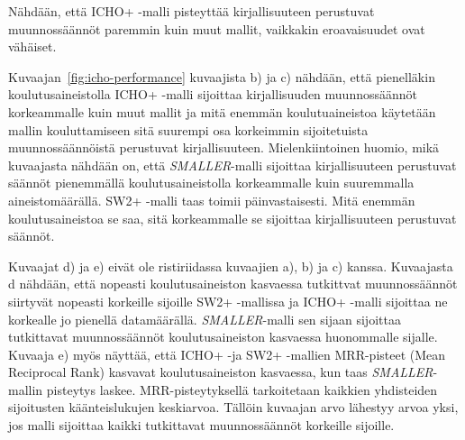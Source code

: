 \documentclass[finnish,twoside,censored,tkt,sw-line]{HYthesisML}
\begin{document}
Nähdään, että ICHO+ -malli pisteyttää kirjallisuuteen perustuvat muunnossäännöt paremmin kuin muut mallit, vaikkakin eroavaisuudet ovat vähäiset.

Kuvaajan~\ref{fig:icho-performance} kuvaajista b) ja c) nähdään, että pienelläkin koulutusaineistolla ICHO+ -malli sijoittaa kirjallisuuden muunnossäännöt korkeammalle kuin muut mallit ja mitä enemmän koulutuaineistoa käytetään mallin kouluttamiseen sitä suurempi osa korkeimmin sijoitetuista muunnossäännöistä perustuvat kirjallisuuteen.
Mielenkiintoinen huomio, mikä kuvaajasta nähdään on, että \emph{SMALLER}-malli sijoittaa kirjallisuuteen perustuvat säännöt pienemmällä koulutusaineistolla korkeammalle kuin suuremmalla aineistomäärällä.
SW2+ -malli taas toimii päinvastaisesti.
Mitä enemmän koulutusaineistoa se saa, sitä korkeammalle se sijoittaa kirjallisuuteen perustuvat säännöt.

Kuvaajat d) ja e) eivät ole ristiriidassa kuvaajien a), b) ja c) kanssa.
Kuvaajasta d nähdään, että nopeasti koulutusaineiston kasvaessa tutkittvat muunnossäännöt siirtyvät nopeasti korkeille sijoille SW2+ -mallissa ja ICHO+ -malli sijoittaa ne korkealle jo pienellä datamäärällä.
\emph{SMALLER}-malli sen sijaan sijoittaa tutkittavat muunnossäännöt koulutusaineiston kasvaessa huonommalle sijalle.
Kuvaaja e) myös näyttää, että ICHO+ -ja SW2+ -mallien MRR-pisteet (Mean Reciprocal Rank) kasvavat koulutusaineiston kasvaessa, kun taas \emph{SMALLER}-mallin pisteytys laskee.
MRR-pisteytyksellä tarkoitetaan kaikkien yhdisteiden sijoitusten käänteislukujen keskiarvoa.
Tällöin kuvaajan arvo lähestyy arvoa yksi, jos malli sijoittaa kaikki tutkittavat muunnossäännöt korkeille sijoille.
\end{document}
